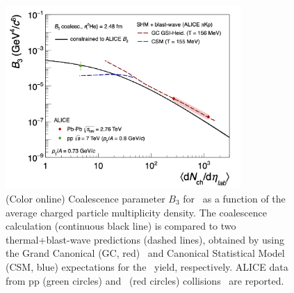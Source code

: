 \documentclass{appolb}
\begin{document}
\begin{figure}[htb]
\begin{center}
\includegraphics[width=0.8\textwidth]{B3vsMult073.png}
\caption{(Color online) Coalescence parameter $B_3$ for \hethree~as a function of the average charged particle multiplicity density. The coalescence calculation (continuous black line) is compared to two thermal+blast-wave predictions (dashed lines), obtained by using the Grand Canonical (GC, red)~\cite{Andronic:2017} and Canonical Statistical Model (CSM, blue) \cite{Vovchenko:2018fiy} expectations for the \hethree~yield, respectively. ALICE data from pp (green circles) and \PbPb~(red circles) collisions~\cite{ALICE:nucleipp2017,ALICE:deuteronppPbPb2015} are reported. }
\label{Fig:3He}
\end{center}
\end{figure} 

\newpage
 	

\end{document}

